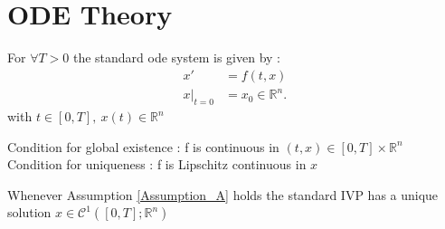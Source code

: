 \section{ODE Theory}
\begin{definition}
 For $\forall  T > 0 $  the standard ode system is given by : 
 \begin{align*}
  x' &= f(t,x) \\
  x \vert_{t=0} &=  x_0 \in \mathbb{R}^{n} 
 .\end{align*}
 with $t \in  [0,T] ,\ x(t) \in  \mathbb{R}^{n} $
\end{definition}
\begin{assumption}\label{Assumption_A}
  Condition for global existence : f is continuous in $(t,x) \in  [0,T] \times \mathbb{R}^{n} $ \\ 
  Condition for uniqueness : f is Lipschitz continuous in $x$  
\end{assumption}
\begin{theorem}
  Whenever Assumption \ref{Assumption_A} holds the standard IVP has a unique solution $x \in  \mathcal{C}^{1}([0,T] ; \mathbb{R}^{n} ) $
\end{theorem}
